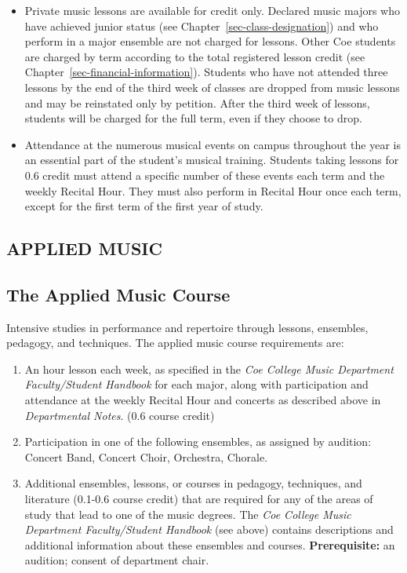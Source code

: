 \documentclass[
  letterpaper,
]{scrbook}
\providecommand{\tightlist}{%
  \setlength{\itemsep}{0pt}\setlength{\parskip}{0pt}}
\begin{document}
\begin{itemize}
\tightlist
\item
  Private music lessons are available for credit only. Declared music
  majors who have achieved junior status (see
  Chapter~\ref{sec-class-designation}) and who perform in a major
  ensemble are not charged for lessons. Other Coe students are charged
  by term according to the total registered lesson credit (see
  Chapter~\ref{sec-financial-information}). Students who have not
  attended three lessons by the end of the third week of classes are
  dropped from music lessons and may be reinstated only by petition.
  After the third week of lessons, students will be charged for the full
  term, even if they choose to drop.
\item
  Attendance at the numerous musical events on campus throughout the
  year is an essential part of the student's musical training. Students
  taking lessons for 0.6 credit must attend a specific number of these
  events each term and the weekly Recital Hour. They must also perform
  in Recital Hour once each term, except for the first term of the first
  year of study.
\end{itemize}

\subsection{APPLIED MUSIC}\label{applied-music}

\subsection{The Applied Music Course}\label{the-applied-music-course}

Intensive studies in performance and repertoire through lessons,
ensembles, pedagogy, and techniques. The applied music course
requirements are:

\begin{enumerate}
\def\labelenumi{\arabic{enumi}.}
\tightlist
\item
  An hour lesson each week, as specified in the \emph{Coe College Music
  Department Faculty/Student Handbook} for each major, along with
  participation and attendance at the weekly Recital Hour and concerts
  as described above in \emph{Departmental Notes}. (0.6 course credit)
\item
  Participation in one of the following ensembles, as assigned by
  audition: Concert Band, Concert Choir, Orchestra, Chorale.
\item
  Additional ensembles, lessons, or courses in pedagogy, techniques, and
  literature (0.1-0.6 course credit) that are required for any of the
  areas of study that lead to one of the music degrees. The \emph{Coe
  College Music Department Faculty/Student Handbook} (see above)
  contains descriptions and additional information about these ensembles
  and courses. \textbf{Prerequisite:} an audition; consent of department
  chair.
\end{enumerate}
\end{document}
